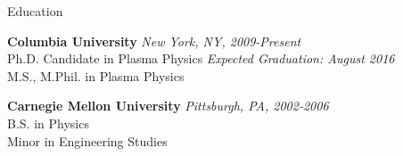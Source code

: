 \documentclass{resume} %
\begin{document}

\begin{rSection}{Education}

{\bf Columbia University } \hfill {\em New York, NY, 2009-Present} \\ 
Ph.D. Candidate in Plasma Physics \hfill {\em  Expected Graduation: August 2016}\\
M.S., M.Phil. in Plasma Physics\smallskip 

{\bf Carnegie Mellon University } \hfill {\em Pittsburgh, PA, 2002-2006} \\ 
B.S. in Physics \\
Minor in Engineering Studies \smallskip

\end{rSection}

\end{document}
